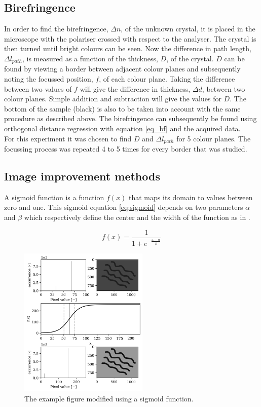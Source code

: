 \subsection{Birefringence}
In order to find the birefringence, $\Delta n$, of the unknown crystal, it is placed in the microscope with the polariser crossed with respect to the analyser. The crystal is then turned until bright colours can be seen. Now the difference in path length, $\Delta l_{path}$, is measured as a function of the thickness, $D$, of the crystal. $D$ can be found by viewing a border between adjacent colour planes and subsequently noting the focussed position, $f$, of each colour plane. Taking the difference between two values of $f$ will give the difference in thickness, $\Delta d$, between two colour planes. Simple addition and subtraction will give the values for $D$. The bottom of the sample (black) is also to be taken into account with the same procedure as described above. The birefringence can subsequently be found using orthogonal distance regression with equation \ref{eq_bf} and the acquired data.\\
For this experiment it was chosen to find $D$ and $\Delta l_{path}$ for 5 colour planes. The focussing process was repeated 4 to 5 times for every border that was studied.

\subsection{Image improvement methods}
\label{section:imageimprovement}
A sigmoid function is a function $f(x)$ that maps its domain to values between zero and one. This sigmoid equation \ref{eq:sigmoid} depends on two parameters $\alpha$ and $\beta$ which respectively define the center and the width of the function as in \cite{article_sigmoid}.

\begin{equation}
    f(x) = \frac{1}{1+e^{-\frac{x-\alpha}{\beta}}}
    \label{eq:sigmoid}
\end{equation}

\begin{figure}
    \centering
    \includegraphics[width=0.55\textwidth,keepaspectratio]{afbeeldingen/sigmoid_explained.png}
    \caption{The example figure modified using a sigmoid function.}
    \label{fig:sigmoid}
\end{figure}

